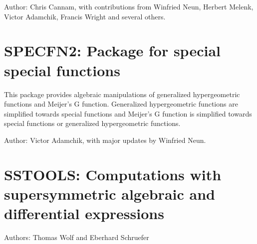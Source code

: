 Author:  Chris Cannam, with contributions from Winfried Neun, Herbert
Melenk, Victor Adamchik, Francis Wright and several others.

\section{SPECFN2: Package for special special functions} 


This package provides algebraic manipulations of generalized
hypergeometric functions and Meijer's G function.  Generalized
hypergeometric functions are simplified towards special functions and
Meijer's G function is simplified towards special functions or generalized
hypergeometric functions.

Author: Victor Adamchik, with major updates by Winfried Neun.


\newpage

\section{SSTOOLS: Computations with supersymmetric algebraic and differential
expressions}


Authors: Thomas Wolf and Eberhard Schruefer

